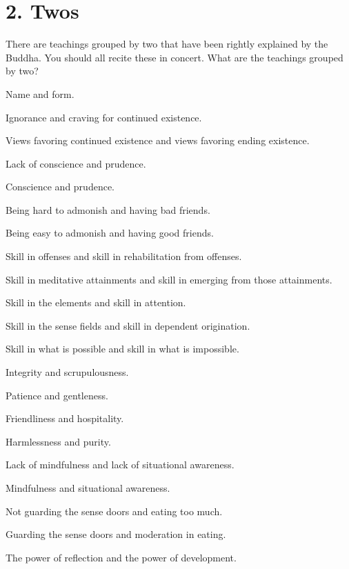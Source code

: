\documentclass[12pt,openany]{book}%
\begin{document}
\section*{2. Twos }

There are teachings grouped by two that have been rightly explained by the Buddha. You should all recite these in concert. What are the teachings grouped by two? 

Name and form. 

Ignorance and craving for continued existence. 

Views favoring continued existence and views favoring ending existence. 

Lack of conscience and prudence. 

Conscience and prudence. 

Being hard to admonish and having bad friends. 

Being easy to admonish and having good friends. 

Skill in offenses and skill in rehabilitation from offenses. 

Skill in meditative attainments and skill in emerging from those attainments. 

Skill in the elements and skill in attention. 

Skill in the sense fields and skill in dependent origination. 

Skill in what is possible and skill in what is impossible. 

Integrity and scrupulousness. 

Patience and gentleness. 

Friendliness and hospitality. 

Harmlessness and purity. 

Lack of mindfulness and lack of situational awareness. 

Mindfulness and situational awareness. 

Not guarding the sense doors and eating too much. 

Guarding the sense doors and moderation in eating. 

The power of reflection and the power of development. 
\end{document}
